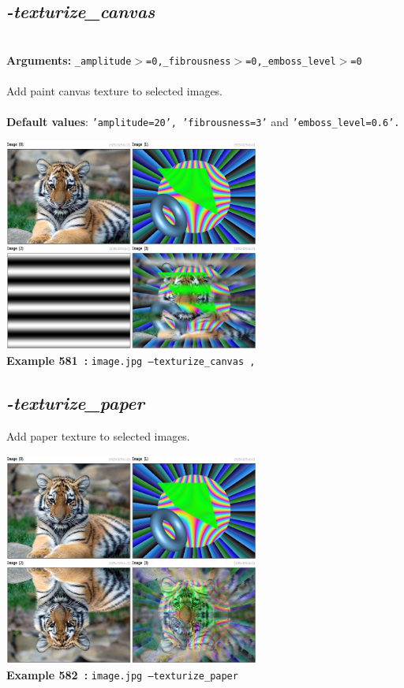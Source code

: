 \documentclass[a4paper,11pt,twoside]{book}
\begin{document}
\subsection{\emph{-texturize\_canvas} }\vspace*{-0.5em}
~\\\textbf{Arguments: } 
{\small \texttt{\_amplitude$>$=0,\_fibrousness$>$=0,\_emboss\_level$>$=0}}\\~\\
Add paint canvas texture to selected images.
~\\~\\\textbf{Default values}: {\small \texttt{'amplitude=20', 'fibrousness=3'} and \texttt{'emboss\_level=0.6'.}}
\begin{center}\includegraphics[keepaspectratio=true,height=7cm,width=\textwidth]{img/gmic_def581.jpg}\\
{\footnotesize \textbf{Example 581~:} \texttt{image.jpg --texturize\_canvas ,}}
\end{center}

\subsection{\emph{-texturize\_paper} }\vspace*{-0.5em}
Add paper texture to selected images.
\begin{center}\includegraphics[keepaspectratio=true,height=7cm,width=\textwidth]{img/gmic_def582.jpg}\\
{\footnotesize \textbf{Example 582~:} \texttt{image.jpg --texturize\_paper}}
\end{center}
\end{document}
